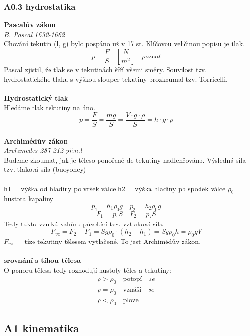 \documentclass{article}
\begin{document}
\subsubsection*{A0.3 hydrostatika}
\textbf{Pascalův zákon} \\
\emph{B. Pascal 1632-1662} \\
Chování tekutin (l, g) bylo pospáno už v 17 st. Klíčovou veličinou popisu je tlak.
\[
p = \frac{F}{S} \quad [\frac{N}{m^2}] \quad pascal
\]
Pascal zjistil, že tlak se v tekutinách šíří všemi směry. Souvilost tzv. hydrostatického tlaku s výškou sloupce tekutiny prozkoumal tzv. Torricelli. \\\\
\textbf{Hydrostatický tlak} \\
Hledáme tlak tekutiny na dno. 
\[
p = \frac{F}{S} = \frac{mg}{S} = \frac{V \cdot g \cdot \rho}{S} = h \cdot g \cdot \rho
\]\\
\textbf{Archimédův zákon}\\
\emph{Archimedes 287-212 př.n.l}\\
Budeme zkoumat, jak je těleso ponořené do tekutiny nadlehčováno. Výsledná síla tzv. tlaková síla (buoyoncy) \\\\
h1 = výška od hladiny po vršek válce h2 = výška hladiny po spodek válce $\rho_0$ = hustota kapaliny
\[
p_1 = h_1\rho_0g \quad p_2 = h_2\rho_0g
\]
\[
F_1 = p_1S \quad F_2 = p_2S
\]
Tedy takto vzniká vzhůru působící tzv. vztlaková síla
\[
F_{vz} = F_2 - F_1 = Sg\rho_0 \cdot (h_2 - h_1) = Sg\rho_0h = \rho_0gV 
\]
$F_{vz} =$ tíze tekutiny tělesem vytlačené. To jest Archimédův zákon. \\\\
\textbf{srovnání s tíhou tělesa}\\
O ponoru tělesa tedy rozhodují hustoty těles a tekutiny:\\
\begin{align*}
    \rho > \rho_0 \quad \text{potopí} \quad se\\
    \rho = \rho_0 \quad \text{vznáší} \quad se\\
    \rho < \rho_0 \quad \text{plove} 
\end{align*}

\subsection*{A1 kinematika}
\end{document}
